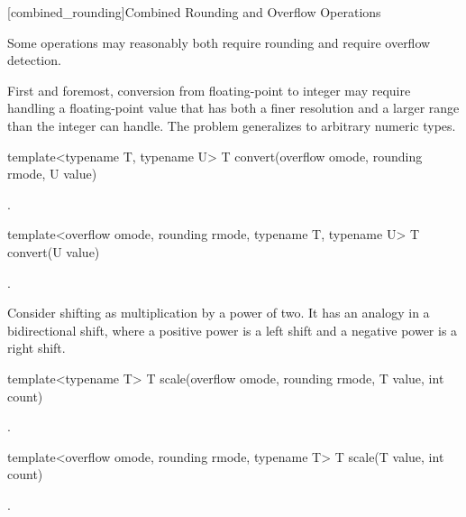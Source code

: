 [combined_rounding]{Combined Rounding and Overflow Operations}

Some operations may reasonably both require rounding and require overflow detection.

First and foremost, conversion from floating-point to integer may require handling a floating-point value that has both a finer resolution and a larger range than the integer can handle. The problem generalizes to arbitrary numeric types.

\begin{itemdecl}
template<typename T, typename U> T convert(overflow omode, rounding rmode, U value)		
\end{itemdecl}

\begin{itemdescr}
\returns {}.	
\end{itemdescr}

\begin{itemdecl}
template<overflow omode, rounding rmode, typename T, typename U> T convert(U value)		
\end{itemdecl}

\begin{itemdescr}
\returns {}.	
\end{itemdescr}

Consider shifting as multiplication by a power of two. It has an analogy in a bidirectional shift, where a positive power is a left shift and a negative power is a right shift.

\begin{itemdecl}
template<typename T> T scale(overflow omode, rounding rmode, T value, int count)		
\end{itemdecl}

\begin{itemdescr}
\returns {}.	
\end{itemdescr}

\begin{itemdecl}
template<overflow omode, rounding rmode, typename T> T scale(T value, int count)		
\end{itemdecl}

\begin{itemdescr}
\returns {}.	
\end{itemdescr}

